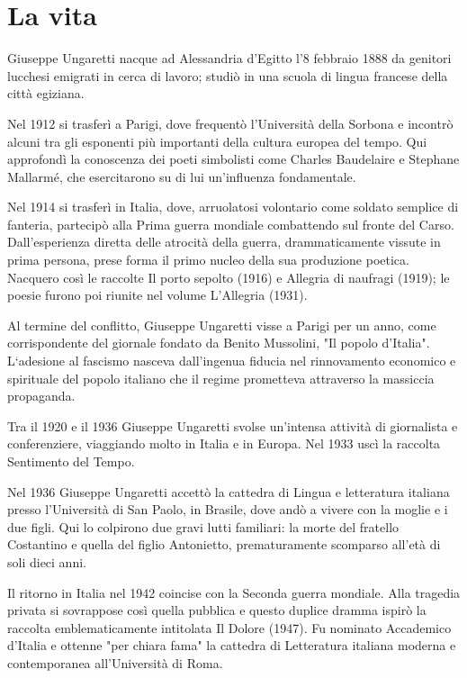 \section{La vita}
Giuseppe Ungaretti nacque ad Alessandria d’Egitto l’8 febbraio 1888 da genitori lucchesi emigrati in cerca di lavoro; studiò in una scuola di lingua francese della città egiziana.

Nel 1912 si trasferì a Parigi, dove frequentò l’Università della Sorbona e incontrò alcuni tra gli esponenti più importanti della cultura europea del tempo. Qui approfondì la conoscenza dei poeti simbolisti come Charles Baudelaire e Stephane Mallarmé, che esercitarono su di lui un’influenza fondamentale.

Nel 1914 si trasferì in Italia, dove, arruolatosi volontario come soldato semplice di fanteria, partecipò alla Prima guerra mondiale combattendo sul fronte del Carso.  Dall’esperienza diretta delle atrocità della guerra, drammaticamente vissute in prima persona, prese forma il primo nucleo della sua produzione poetica. Nacquero così le raccolte Il porto sepolto (1916) e Allegria di naufragi (1919); le poesie furono poi riunite nel volume L’Allegria (1931).

Al termine del conflitto, Giuseppe Ungaretti visse a Parigi per un anno, come corrispondente del giornale fondato da Benito Mussolini, "Il popolo d’Italia". L‘adesione al fascismo nasceva dall’ingenua fiducia nel rinnovamento economico e spirituale del popolo italiano che il regime prometteva attraverso la massiccia propaganda.

Tra il 1920 e il 1936 Giuseppe Ungaretti svolse un’intensa attività di giornalista e conferenziere, viaggiando molto in Italia e in Europa. Nel 1933 uscì la raccolta Sentimento del Tempo.

Nel 1936 Giuseppe Ungaretti accettò la cattedra di Lingua e letteratura italiana presso l’Università di San Paolo, in Brasile, dove andò a vivere con la moglie e i due figli. Qui lo colpirono due gravi lutti familiari: la morte del fratello Costantino e quella del figlio Antonietto, prematuramente scomparso all’età di soli dieci anni.

Il ritorno in Italia nel 1942 coincise con la Seconda guerra mondiale. Alla tragedia privata si sovrappose così quella pubblica e questo duplice dramma ispirò la raccolta emblematicamente intitolata Il Dolore (1947). Fu nominato Accademico d’Italia e ottenne "per chiara fama" la cattedra di Letteratura italiana moderna e contemporanea all’Università di Roma.

